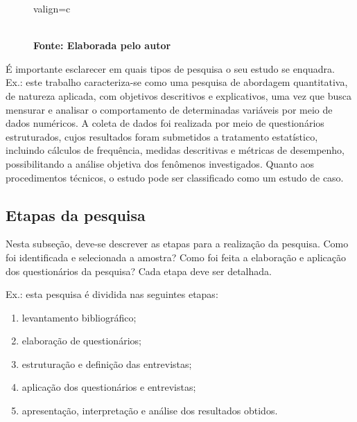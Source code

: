 \begin{figure}[H]
\begin{adjustbox}{valign=c}
{}
\end{adjustbox}
	\vspace{.1cm}  %
	\\\textbf{\footnotesize Fonte: Elaborada pelo autor}  
 \label{fig:metodologia}
\end{figure}

É importante esclarecer em quais tipos de pesquisa o seu estudo se enquadra.
Ex.: este trabalho caracteriza-se como uma pesquisa de abordagem quantitativa, de natureza aplicada, com objetivos descritivos e explicativos, uma vez que busca mensurar e analisar o comportamento de determinadas variáveis por meio de dados numéricos. A coleta de dados foi realizada por meio de questionários estruturados, cujos resultados foram submetidos a tratamento estatístico, incluindo cálculos de frequência, medidas descritivas e métricas de desempenho, possibilitando a análise objetiva dos fenômenos investigados. Quanto aos procedimentos técnicos, o estudo pode ser classificado como um estudo de caso.

\estrutura\subsection{\esp Etapas da pesquisa}\instrucao

	Nesta subseção, deve-se descrever as etapas para a realização da pesquisa. Como foi identificada e selecionada a amostra? Como foi feita a elaboração e aplicação dos questionários da pesquisa? Cada etapa deve ser detalhada.

Ex.: esta pesquisa é dividida nas seguintes etapas:

\begin{enumerate}
\item levantamento bibliográfico;
\item elaboração de questionários;
\item estruturação e definição das entrevistas;
\item aplicação dos questionários e entrevistas;
\item apresentação, interpretação e análise dos resultados obtidos.
\end{enumerate}


